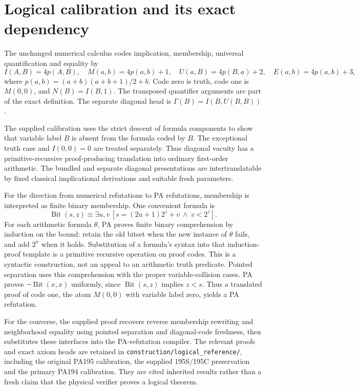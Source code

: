 \documentclass[11pt,letterpaper]{article}
\newcommand{\file}[1]{\texttt{\nolinkurl{#1}}}
\begin{document}
\section{Logical calibration and its exact dependency}

The unchanged numerical calculus codes implication, membership,
universal quantification and equality by
\[
 I(A,B)=4p(A,B),\quad M(a,b)=4p(a,b)+1,\quad
 U(a,B)=4p(B,a)+2,\quad E(a,b)=4p(a,b)+3,
\]
where $p(a,b)=(a+b)(a+b+1)/2+b$. Code zero is truth, code one is
$M(0,0)$, and $N(B)=I(B,1)$. The transposed quantifier arguments are
part of the exact definition. The separate diagonal head is
$\Gamma(B)=I(B,U(B,B))$.

The supplied calibration uses the strict descent of formula components
to show that variable label $B$ is absent from the formula coded by
$B$. The exceptional truth case and $I(0,0)=0$ are treated separately.
Thus diagonal vacuity has a primitive-recursive proof-producing
translation into ordinary first-order arithmetic. The bundled and
separate diagonal presentations are intertranslatable by fixed classical
implicational derivations and suitable fresh parameters.

For the direction from numerical refutations to PA refutations,
membership is interpreted as finite binary membership. One convenient
formula is
\[
 \operatorname{Bit}(s,z)\equiv
 \exists u,v\,[s=(2u+1)2^z+v\ \wedge\ v<2^z].
\]
For each arithmetic formula $\theta$, PA proves finite binary
comprehension by induction on the bound: retain the old bitset when the
new instance of $\theta$ fails, and add $2^n$ when it holds. Substitution
of a formula's syntax into that induction-proof template is a primitive
recursive operation on proof codes. This is a syntactic construction,
not an appeal to an arithmetic truth predicate. Pointed separation
uses this comprehension with the proper variable-collision cases.
PA proves $\neg\operatorname{Bit}(x,x)$ uniformly, since
$\operatorname{Bit}(s,z)$ implies $z<s$. Thus a translated proof of code
one, the atom $M(0,0)$ with variable label zero, yields a PA refutation.

For the converse, the supplied proof recovers reverse membership
rewriting and neighborhood equality using pointed separation and
diagonal-code freshness, then substitutes these interfaces into the
PA-refutation compiler. The relevant proofs and exact axiom heads are
retained in \file{construction/logical_reference/}, including the
original PA195 calibration, the supplied 195S/195C preservation and
the primary PA194 calibration. They are cited inherited results rather
than a fresh claim that the physical verifier proves a logical theorem.
\end{document}
